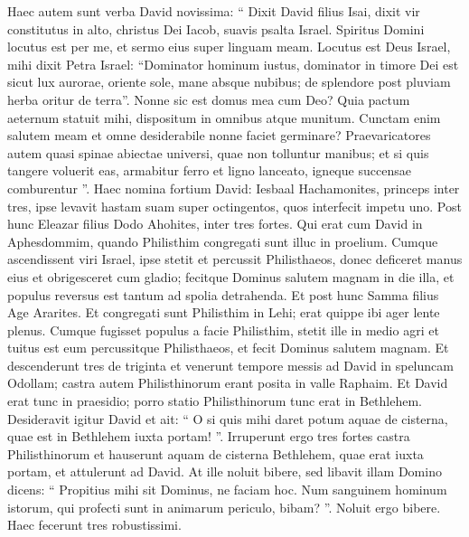 \begin{biblechapter}
\begin{biblechapter}
\begin{biblechapter}
\begin{biblechapter}
\begin{biblechapter}
\begin{biblechapter}
\begin{biblechapter}
\begin{biblechapter}
\begin{biblechapter}
\begin{biblechapter}
\begin{biblechapter}
\begin{biblechapter}
\begin{biblechapter}
\begin{biblechapter}
\begin{biblechapter}
\begin{biblechapter}
\begin{biblechapter}
\begin{biblechapter}
\begin{biblechapter}
\begin{biblechapter}
\begin{biblechapter}
\begin{biblechapter}
\begin{biblechapter}
\verse Haec autem sunt verba David novissima:
 “ Dixit David filius Isai,
 dixit vir constitutus in alto,
 christus Dei Iacob,
 suavis psalta Israel.
 \verse Spiritus Domini locutus est per me, et sermo eius super linguam meam. 
\verse Locutus est Deus Israel,
 mihi dixit Petra Israel:
 “Dominator hominum iustus,
 dominator in timore Dei
 \verse est sicut lux aurorae, oriente sole,
 mane absque nubibus;
 de splendore post pluviam
 herba oritur de terra”.
 \verse Nonne sic est domus mea cum Deo?
 Quia pactum aeternum statuit mihi,
 dispositum in omnibus atque munitum.
 Cunctam enim salutem meam et omne desiderabile
 nonne faciet germinare?
 \verse Praevaricatores autem
 quasi spinae abiectae universi,
 quae non tolluntur manibus;
 \verse et si quis tangere voluerit eas,
 armabitur ferro et ligno lanceato,
 igneque succensae comburentur ”. 
\verse Haec nomina fortium David:
 Iesbaal Hachamonites, princeps inter tres, ipse levavit hastam suam super octingentos, quos interfecit impetu uno.
 \verse Post hunc Eleazar filius Dodo Ahohites, inter tres fortes. Qui erat cum David in Aphesdommim, quando Philisthim congregati sunt illuc in proelium. 
\verse Cumque ascendissent viri Israel, ipse stetit et percussit Philisthaeos, donec deficeret manus eius et obrigesceret cum gladio; fecitque Dominus salutem magnam in die illa, et populus reversus est tantum ad spolia detrahenda.
 \verse Et post hunc Samma filius Age Ararites. Et congregati sunt Philisthim in Lehi; erat quippe ibi ager lente plenus. Cumque fugisset populus a facie Philisthim, 
\verse stetit ille in medio agri et tuitus est eum percussitque Philisthaeos, et fecit Dominus salutem magnam.
 \verse Et descenderunt tres de triginta et venerunt tempore messis ad David in speluncam Odollam; castra autem Philisthinorum erant posita in valle Raphaim. 
 \verse Et David erat tunc in praesidio; porro statio Philisthinorum tunc erat in Bethlehem. 
\verse Desideravit igitur David et ait: “ O si quis mihi daret potum aquae de cisterna, quae est in Bethlehem iuxta portam! ”. 
\verse Irruperunt ergo tres fortes castra Philisthinorum et hauserunt aquam de cisterna Bethlehem, quae erat iuxta portam, et attulerunt ad David. At ille noluit bibere, sed libavit illam Domino 
\verse dicens: “ Propitius mihi sit Dominus, ne faciam hoc. Num sanguinem hominum istorum, qui profecti sunt in animarum periculo, bibam? ”. Noluit ergo bibere. Haec fecerunt tres robustissimi.

\end{biblechapter}
\end{biblechapter}
\end{biblechapter}
\end{biblechapter}
\end{biblechapter}
\end{biblechapter}
\end{biblechapter}
\end{biblechapter}
\end{biblechapter}
\end{biblechapter}
\end{biblechapter}
\end{biblechapter}
\end{biblechapter}
\end{biblechapter}
\end{biblechapter}
\end{biblechapter}
\end{biblechapter}
\end{biblechapter}
\end{biblechapter}
\end{biblechapter}
\end{biblechapter}
\end{biblechapter}
\end{biblechapter}
